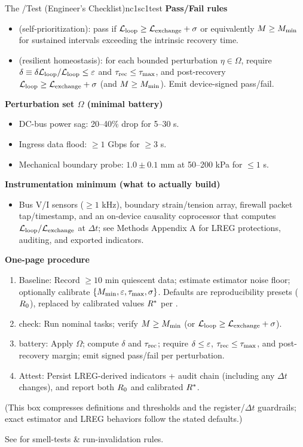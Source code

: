 \documentclass[11pt]{article}
\begin{document}
\begin{docbox}{The \NC/\SC Test (Engineer's Checklist)}{nc1sc1test}
\textbf{Pass/Fail rules}
\begin{itemize}
\item \NC (self-prioritization): pass if $\mathcal{L}_{\text{loop}} \geq \mathcal{L}_{\text{exchange}} + \sigma$ or equivalently $M \geq M_{\min}$ for sustained intervals exceeding the intrinsic recovery time.
\item \SC (resilient homeostasis): for each bounded perturbation $\eta \in \Omega$, require $\delta \equiv \delta\mathcal{L}_{\text{loop}}/\mathcal{L}_{\text{loop}} \leq \varepsilon$ and $\tau_{\text{rec}} \leq \tau_{\max}$, and post-recovery $\mathcal{L}_{\text{loop}} \geq \mathcal{L}_{\text{exchange}} + \sigma$ (and $M \geq M_{\min}$). Emit device-signed pass/fail.
\end{itemize}

\textbf{Perturbation set $\Omega$ (minimal battery)}
\begin{itemize}
\item DC-bus power sag: 20--40\% drop for 5--30 s.
\item Ingress data flood: $\geq 1$ Gbps for $\geq 3$ s.
\item Mechanical boundary probe: $1.0 \pm 0.1$ mm at 50--200 kPa for $\leq 1$ s.
\end{itemize}

\textbf{Instrumentation minimum (what to actually build)}
\begin{itemize}
\item Bus V/I sensors ($\geq 1$ kHz), boundary strain/tension array, firewall packet tap/timestamp, and an on-device causality coprocessor that computes $\mathcal{L}_{\text{loop}}/\mathcal{L}_{\text{exchange}}$ at $\Delta t$; see Methods Appendix A for LREG protections, auditing, and exported indicators.
\end{itemize}

\textbf{One-page procedure}
\begin{enumerate}
\item Baseline: Record $\geq 10$ min quiescent data; estimate estimator noise floor; optionally calibrate $\{M_{\min}, \varepsilon, \tau_{\max}, \sigma\}$. Defaults are reproducibility presets ($R_0$), replaced by calibrated values $R^*$ per .
\item \NC check: Run nominal tasks; verify $M \geq M_{\min}$ (or $\mathcal{L}_{\text{loop}} \geq \mathcal{L}_{\text{exchange}} + \sigma$).
\item \SC battery: Apply $\Omega$; compute $\delta$ and $\tau_{\text{rec}}$; require $\delta \leq \varepsilon$, $\tau_{\text{rec}} \leq \tau_{\max}$, and post-recovery margin; emit signed pass/fail per perturbation.
\item Attest: Persist LREG-derived indicators + audit chain (including any $\Delta t$ changes), and report both $R_0$ and calibrated $R^*$.
\end{enumerate}

(This box compresses  definitions and thresholds and the  register/$\Delta t$ guardrails; exact estimator and LREG behaviors follow the stated defaults.)

See  for smell-tests \& run-invalidation rules.
\end{docbox}
\end{document}
